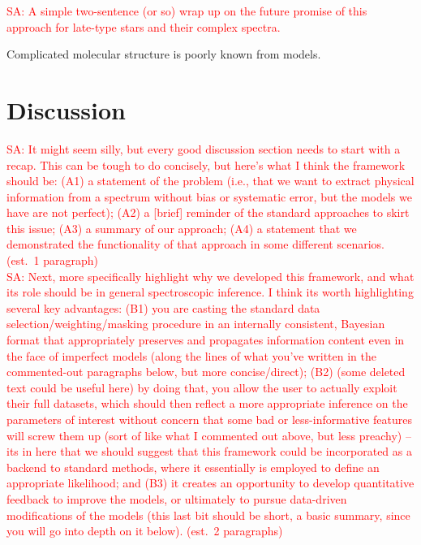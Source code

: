 \documentclass[iop,floatfix]{emulateapj}
\newcommand{\comm}[1]{ \textcolor{red}{SA: #1}}
\begin{document}
\comm{A simple two-sentence (or so) wrap up on the future promise of this approach for late-type 
stars and their complex spectra.}

Complicated molecular structure is poorly known from models.



\clearpage

\section{Discussion} \label{sec:discussion}

\comm{It might seem silly, but every good discussion section needs to start with a recap.  This can 
be tough to do concisely, but here's what I think the framework should be: (A1) a statement of the 
problem (i.e., that we want to extract physical information from a spectrum without bias or 
systematic error, but the models we have are not perfect); (A2) a [brief] reminder of the standard 
approaches to skirt this issue; (A3) a summary of our approach; (A4) a statement that we demonstrated 
the functionality of that approach in some different scenarios.  (est.~1 paragraph)} \\

\comm{Next, more specifically highlight why we developed this framework, and what its 
role should be in general spectroscopic inference.  I think its worth highlighting several key 
advantages: (B1) you are casting the standard data selection/weighting/masking procedure in an 
internally consistent, Bayesian format that appropriately preserves and propagates information 
content even in the face of imperfect models (along the lines of what you've written in the 
commented-out paragraphs below, but more concise/direct); (B2) (some deleted text could be useful here) by doing that, you allow the user to 
actually exploit their full datasets, which should then reflect a more appropriate inference on the 
parameters of interest without concern that some bad or less-informative features will screw them 
up (sort of like what I commented out above, but less preachy) -- its in here 
that we should suggest that this framework could be incorporated as a backend to standard methods, 
where it essentially is employed to define an appropriate likelihood; and (B3) it creates an 
opportunity to develop quantitative feedback to improve the models, or ultimately to 
pursue data-driven modifications of the models (this last bit should be short, a basic summary, 
since you will go into depth on it below). (est.~2 paragraphs)} \\
\end{document}
